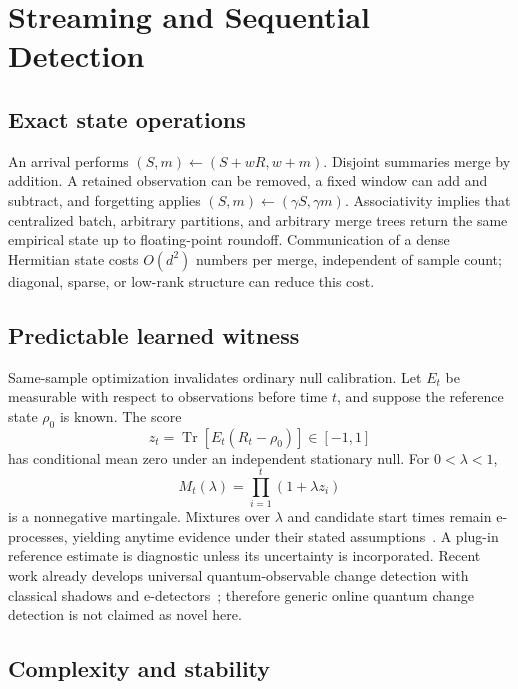 \documentclass[letterpaper,journal]{IEEEtran}
\newcommand{\Tr}{\operatorname{Tr}}
\begin{document}
\section{Streaming and Sequential Detection}

\subsection{Exact state operations}

An arrival performs $(S,m)\leftarrow(S+wR,w+m)$. Disjoint summaries merge by
addition. A retained observation can be removed, a fixed window can add and
subtract, and forgetting applies $(S,m)\leftarrow(\gamma S,\gamma m)$.
Associativity implies that centralized batch, arbitrary partitions, and
arbitrary merge trees return the same empirical state up to floating-point
roundoff. Communication of a dense Hermitian state costs $O(d^2)$ numbers per
merge, independent of sample count; diagonal, sparse, or low-rank structure
can reduce this cost.

\subsection{Predictable learned witness}

Same-sample optimization invalidates ordinary null calibration. Let $E_t$ be
measurable with respect to observations before time $t$, and suppose the
reference state $\rho_0$ is known. The score
\begin{equation}
z_t=\Tr[E_t(R_t-\rho_0)]\in[-1,1]                  \label{eq:score}
\end{equation}
has conditional mean zero under an independent stationary null. For
$0<\lambda<1$,
\begin{equation}
M_t(\lambda)=\prod_{i=1}^t(1+\lambda z_i)           \label{eq:martingale}
\end{equation}
is a nonnegative martingale. Mixtures over $\lambda$ and candidate start times
remain e-processes, yielding anytime evidence under their stated
assumptions~\cite{howard2021}. A plug-in reference estimate is diagnostic
unless its uncertainty is incorporated. Recent work already develops
universal quantum-observable change detection with classical shadows and
e-detectors~\cite{zecchin2026,huang2020}; therefore generic online quantum
change detection is not claimed as novel here.

\subsection{Complexity and stability}
\end{document}

